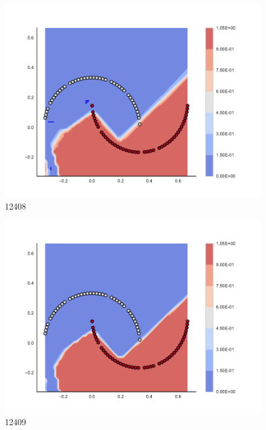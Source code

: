 \begin{subfigure}[b]{0.09\textwidth}
    \includegraphics[clip, trim=2.35cm 1.75cm 4.5cm 0cm,width=\textwidth]{img/convergence/12408.pdf}
    \caption{12408}
    \label{fig:convergence_12408}
\end{subfigure}
%
\begin{subfigure}[b]{0.09\textwidth}
    \includegraphics[clip, trim=2.35cm 1.75cm 4.5cm 0cm,width=\textwidth]{img/convergence/12409.pdf}
    \caption{12409}
    \label{fig:convergence_12409}
\end{subfigure}
%
